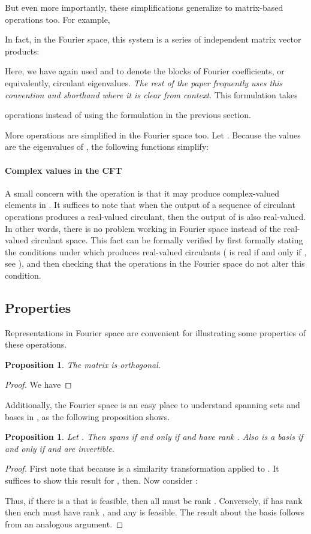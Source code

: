 \documentclass[1p,authoryear,letterpaper]{elsarticle}
\newtheorem{proposition}[theorem]{Proposition}
\begin{document}
But even more importantly, these simplifications generalize to matrix-based
operations too.  For example,

In fact, in the Fourier space, this system is a series of
independent matrix vector products:

Here, we have again used  and  to denote the
blocks of Fourier coefficients, or equivalently, circulant eigenvalues.
\emph{The rest of the paper frequently uses this convention and
shorthand where it is clear from context.}
This formulation takes

operations instead of  using the  formulation
in the previous section.

More operations are simplified in the Fourier space too.
Let .
Because the  values are the eigenvalues of , the following functions simplify:


\paragraph{Complex values in the CFT}

A small concern with the  operation is that it may produce
complex-valued elements in .
It suffices to note that when the output of a sequence of
circulant operations produces a real-valued circulant,
then the output of  is also real-valued.  In other
words, there is no problem working in Fourier space instead
of the real-valued circulant space.  This
fact can be formally verified by first formally stating the conditions
under which  produces real-valued circulants
( is real if and only if ,
see \citet{davis1979-circulant}),
and then
checking that the operations in the Fourier space do not
alter this condition.


\subsection{Properties}
Representations in Fourier space are convenient for illustrating
some properties of these operations. 

\begin{proposition}
The matrix  is orthogonal.
\end{proposition}
\begin{proof} We have

\end{proof}
Additionally, the Fourier space is an easy place to understand
spanning sets and bases in , as the following proposition shows.
\begin{proposition} \label{thm:basis}
Let . Then
 spans  \emph{if and only if} 
and  have rank .  Also 
is a basis \emph{if and only if} 
and  are invertible.
\end{proposition}
\begin{proof}
First note that 
because  is a similarity transformation applied to .
It suffices to show this result for , then.  Now consider
:

Thus, if there is a 
that is feasible, then all  must be rank .
Conversely, if  has rank 
then each  must have rank , and any 
is feasible.  The result about the basis follows
from an analogous argument.
\end{proof}
\end{document}
